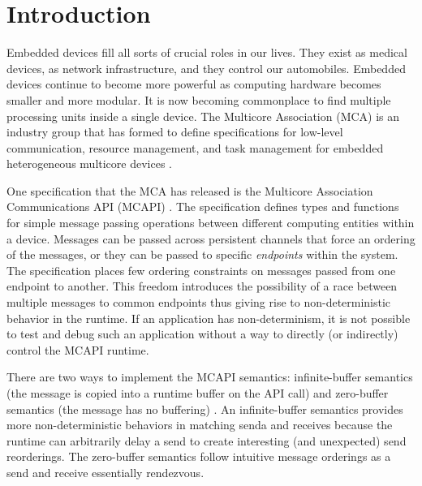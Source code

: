 \section{Introduction}
Embedded devices fill all sorts of crucial roles in our lives. They exist as
medical devices, as network infrastructure, and they control our automobiles.
Embedded devices continue to become more powerful as computing hardware becomes
smaller and more modular. It is now becoming commonplace to find multiple
processing units inside a single device. The Multicore Association (MCA) is an
industry group that has formed to define specifications for low-level
communication, resource management, and task management for embedded heterogeneous
multicore devices \cite{mca}.

One specification that the MCA has released is the Multicore
Association Communications API (MCAPI) \cite{mcapi}. The specification
defines types and functions for simple message passing operations between different
computing entities within a device. Messages can be passed across
persistent channels that force an ordering of the messages, or they
can be passed to specific \emph{endpoints} within the system. The
specification places few ordering constraints on messages passed from
one endpoint to another. This freedom introduces the possibility of a race between multiple messages to common endpoints thus giving rise to non-deterministic behavior in the runtime\cite{netzer:spdt96}. If an
application has non-determinism, it is not possible
to test and debug such an application without a way to directly (or
indirectly) control the MCAPI runtime.

There are two ways to implement the MCAPI semantics:
infinite-buffer semantics (the message is copied into a
runtime buffer on the API call) and zero-buffer semantics
(the message has no buffering)
\cite{sarvani:fm09}.  An infinite-buffer semantics provides
more non-deterministic behaviors in matching senda and receives because
the runtime can arbitrarily delay a send to create interesting (and
unexpected) send reorderings. The zero-buffer semantics
follow intuitive message orderings as a send and receive essentially
rendezvous.

